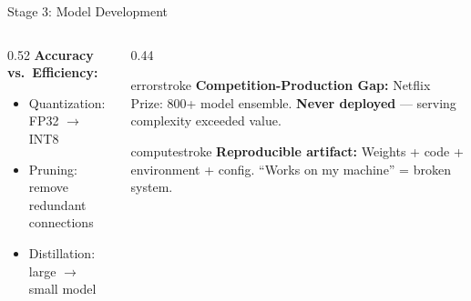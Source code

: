 \documentclass[aspectratio=169, 12pt]{beamer}
\begin{document}
\begin{frame}{Stage 3: Model Development}
\begin{columns}[T]
\begin{column}{0.52\textwidth}
    \vspace{0.05cm}
    \textbf{Accuracy vs.\ Efficiency:}
    \begin{itemize}\setlength\itemsep{0pt}
      \item Quantization: FP32 $\to$ INT8
      \item Pruning: remove redundant connections
      \item Distillation: large $\to$ small model
    \end{itemize}
  \end{column}
  \begin{column}{0.44\textwidth}
    \begin{mlsyscard}{errorstroke}
    {\scriptsize \textbf{Competition-Production Gap:} Netflix Prize: 800+ model ensemble. \textbf{Never deployed} --- serving complexity exceeded value.}
    \end{mlsyscard}

    \vspace{0.05cm}
    \begin{mlsyscard}{computestroke}
    {\scriptsize \textbf{Reproducible artifact:} Weights + code + environment + config. ``Works on my machine'' = broken system.}
    \end{mlsyscard}
  \end{column}
\end{columns}

\end{frame}
\end{document}

